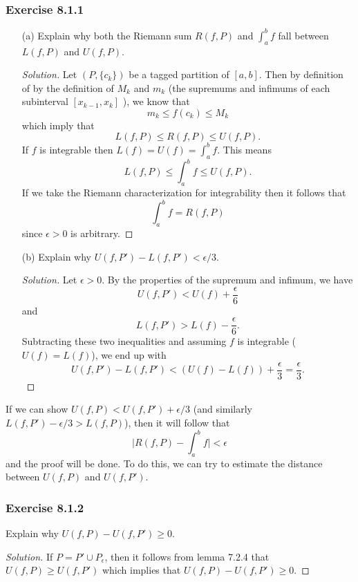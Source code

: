 \subsubsection{Exercise 8.1.1} 
\begin{enumerate}
    \item[(a)] Explain why both the Riemann sum \( R(f,P)  \) and \( \int_{ a }^{ b } f  \) fall between \( L(f,P)  \) and \( U(f,P)  \). 
        \begin{proof}[Solution]
            Let \( (P, \{ c_{k }  \} ) \) be a tagged partition of \( [a,b]  \). Then by definition of by the definition of \( M_{k }  \)  and \( m_{k }   \) (the supremums and infimums  of each subinterval \( [x_{k-1} , x_{k }] \) ), we know that 
            \[  m_{ k } \leq f(c_{ k }  )  \leq M_{k } \] which imply that 
            \[ L(f,P) \leq R(f,P) \leq U(f,P). \]
            If \( f  \) is integrable then \( L(f) = U(f) = \int_{ a }^{ b } f   \). This means 
            \[ L(f,P) \leq \int_{ a }^{ b } f \leq U(f,P).\] If we take the Riemann characterization for integrability then it follows that 
            \[  \int_{ a }^{ b }  f = R(f,P)  \] since \( \epsilon > 0   \) is arbitrary.
        \end{proof}
        \item[(b)] Explain why \( U(f,P') - L(f, P') < \epsilon / 3.  \)
            \begin{proof}[Solution]
           Let \( \epsilon > 0  \). By the properties of the supremum and infimum, we have 
            \[ U(f,P') < U(f) + \frac{ \epsilon  }{ 6 } \] and 
            \[  L(f,P') > L(f) - \frac{ \epsilon  }{ 6 }. \] Subtracting these two inequalities and assuming \( f  \) is integrable (\( U(f) = L(f) \)), we end up with 
            \[  U(f,P') - L(f,P') < (U(f) - L(f)) + \frac{ \epsilon  }{ 3 } = \frac{ \epsilon  }{ 3 }. \]
            \end{proof}
\end{enumerate}

If we can show \( U(f,P) < U(f,P') + \epsilon / 3   \) (and similarly \( L(f,P') - \epsilon / 3 > L(f,P)  \)), then it will follow that 
\[  \Big| R(f,P) - \int_{ a }^{ b } f  \Big| < \epsilon \]
and the proof will be done. To do this, we can try to estimate the distance between \( U(f,P)  \) and \( U(f, P')  \).
\subsubsection{Exercise 8.1.2} Explain why \( U(f,P) - U(f,P') \geq 0  \).
\begin{proof}[Solution]
If \( P = P' \cup P_{\epsilon }  \), then it follows from lemma 7.2.4 that \( U(f,P) \geq U(f,P')   \) which implies that \( U(f,P) - U(f,P') \geq 0  \). 
\end{proof}

